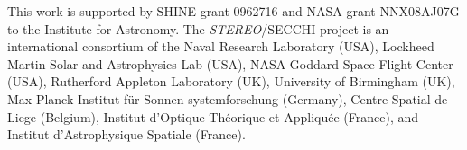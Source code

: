 \documentclass[preprint2]{aastex}
\begin{document}
\acknowledgments

This work is supported by SHINE grant 0962716 and NASA grant NNX08AJ07G to the Institute for Astronomy. %
The \emph{STEREO}/SECCHI project is an international consortium of the Naval Research Laboratory (USA), Lockheed Martin Solar and Astrophysics Lab (USA), NASA Goddard Space Flight Center (USA), Rutherford Appleton Laboratory (UK), University of Birmingham (UK), Max-Planck-Institut f\"{u}r Sonnen-systemforschung (Germany), Centre Spatial de Liege (Belgium), Institut d'Optique Th\'{e}orique et Appliqu\'{e}e (France), and Institut d'Astrophysique Spatiale (France).




  
\end{document}
